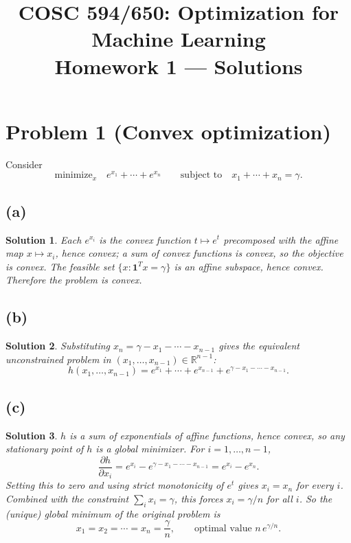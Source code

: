 \documentclass[11pt]{article}
\title{COSC 594/650: Optimization for Machine Learning\\Homework 1 --- Solutions}
\author{}
\date{}
\newcommand{\R}{\mathbb{R}}
\newtheorem*{solution}{Solution}
\begin{document}
\maketitle

\section*{Problem 1 (Convex optimization)}

Consider
\[
\text{minimize}_x \quad e^{x_1}+\cdots+e^{x_n} \qquad \text{subject to} \quad x_1+\cdots+x_n=\gamma.
\]

\subsection*{(a)}
\begin{solution}
Each $e^{x_i}$ is the convex function $t\mapsto e^t$ precomposed with the affine map $x\mapsto x_i$, hence convex; a sum of convex functions is convex, so the objective is convex. The feasible set $\{x:\mathbf 1^Tx=\gamma\}$ is an affine subspace, hence convex. Therefore the problem is convex.
\end{solution}

\subsection*{(b)}
\begin{solution}
Substituting $x_n=\gamma-x_1-\cdots-x_{n-1}$ gives the equivalent unconstrained problem in $(x_1,\dots,x_{n-1})\in\R^{n-1}$:
\[
h(x_1,\dots,x_{n-1}) = e^{x_1}+\cdots+e^{x_{n-1}}+e^{\gamma-x_1-\cdots-x_{n-1}}.
\]
\end{solution}

\subsection*{(c)}
\begin{solution}
$h$ is a sum of exponentials of affine functions, hence convex, so any stationary point of $h$ is a global minimizer. For $i=1,\dots,n-1$,
\[
\frac{\partial h}{\partial x_i} = e^{x_i}-e^{\gamma-x_1-\cdots-x_{n-1}} = e^{x_i}-e^{x_n}.
\]
Setting this to zero and using strict monotonicity of $e^t$ gives $x_i=x_n$ for every $i$. Combined with the constraint $\sum_ix_i=\gamma$, this forces $x_i=\gamma/n$ for all $i$. So the (unique) global minimum of the original problem is
\[
x_1=x_2=\cdots=x_n=\frac{\gamma}{n}, \qquad \text{optimal value } n\,e^{\gamma/n}.
\]
\end{solution}
\end{document}
